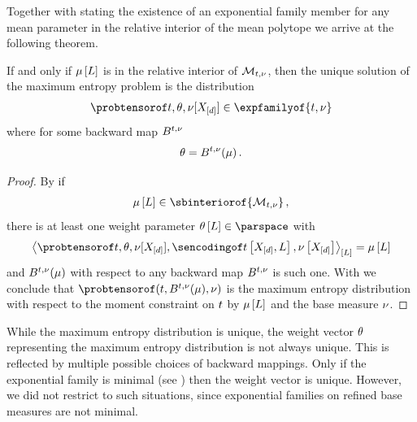 Together with  stating the existence of an exponential family member for any mean parameter in the relative interior of the mean polytope we arrive at the following theorem.

\begin{theorem}
    \label{the:maxEntropyInterior}
    If and only if $\mu\left[L\right]$ is in the relative interior of $\mathcal{M}_{t,\nu}$, then the unique solution of the maximum entropy problem is the distribution
    \begin{align*}
        \expdistofat{\sstat,\weightparam,\basemeasure}{\shortcatvariables}\in\expfamilyof{\sstat,\basemeasure}
    \end{align*}
    where for some backward map $B^{t,\nu}$
    \begin{align*}
        \theta
        = B^{t,\nu}(\mu) \, .
    \end{align*}
\end{theorem}
\begin{proof}
    By  if
    \begin{align*}
        \meanparamwith \in \sbinteriorof{\genmeanset}  \, ,
    \end{align*}
    there is at least one weight parameter $\weightparamwith\in\parspace$ with
    \begin{align*}
        \contractionof{\expdistofat{\sstat,\weightparam,\basemeasure}{\shortcatvariables},\sencsstatwith,\basemeasurewith}{\selvariable}
        =\meanparamat{\selvariable}
    \end{align*}
    and $B^{t,\nu}(\mu)$ with respect to any backward map $B^{t,\nu}$ is such one.
    With  we conclude that $\expdistof{(\sstat,\backwardmapwrtof{\sstat,\basemeasure}{\meanparam},\basemeasure)}$ is the maximum entropy distribution with respect to the moment constraint on $t$ by $\mu\left[L\right]$ and the base measure $\nu$.
\end{proof}

While the maximum entropy distribution is unique, the weight vector $\theta$ representing the maximum entropy distribution is not always unique.
This is reflected by multiple possible choices of backward mappings.
Only if the exponential family is minimal (see \cite{wainwright_graphical_2008}) then the weight vector is unique.
However, we did not restrict to such situations, since exponential families on refined base measures are not minimal.